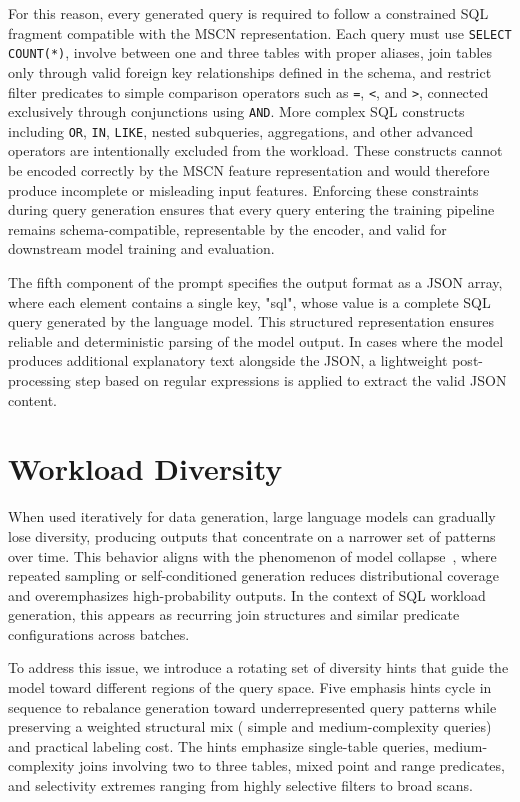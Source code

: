 For this reason, every generated query is required to follow a constrained SQL fragment compatible with the MSCN representation. Each query must use \texttt{SELECT COUNT(*)}, involve between one and three tables with proper aliases, join tables only through valid foreign key relationships defined in the schema, and restrict filter predicates to simple comparison operators such as \texttt{=}, \texttt{<}, and \texttt{>}, connected exclusively through conjunctions using \texttt{AND}. More complex SQL constructs including \texttt{OR}, \texttt{IN}, \texttt{LIKE}, nested subqueries, aggregations, and other advanced operators are intentionally excluded from the workload. These constructs cannot be encoded correctly by the MSCN feature representation and would therefore produce incomplete or misleading input features. Enforcing these constraints during query generation ensures that every query entering the training pipeline remains schema-compatible, representable by the encoder, and valid for downstream model training and evaluation.

The fifth component of the prompt specifies the output format as a JSON array, where each element contains a single key, "sql", whose value is a complete SQL query generated by the language model. This structured representation ensures reliable and deterministic parsing of the model output. In cases where the model produces additional explanatory text alongside the JSON, a lightweight post-processing step based on regular expressions is applied to extract the valid JSON content.


\section{Workload Diversity}

When used iteratively for data generation, large language models can gradually lose diversity, producing outputs that concentrate on a narrower set of patterns over time. This behavior aligns with the phenomenon of model collapse~\cite{collapse}, where repeated sampling or self-conditioned generation reduces distributional coverage and overemphasizes high-probability outputs. In the context of SQL workload generation, this appears as recurring join structures and similar predicate configurations across batches.

To address this issue, we introduce a rotating set of diversity hints that guide the model toward different regions of the query space. Five emphasis hints cycle in sequence to rebalance generation toward underrepresented query patterns while preserving a weighted structural mix ( simple and medium-complexity queries) and practical labeling cost. The hints emphasize single-table queries, medium-complexity joins involving two to three tables, mixed point and range predicates, and selectivity extremes ranging from highly selective filters to broad scans.

